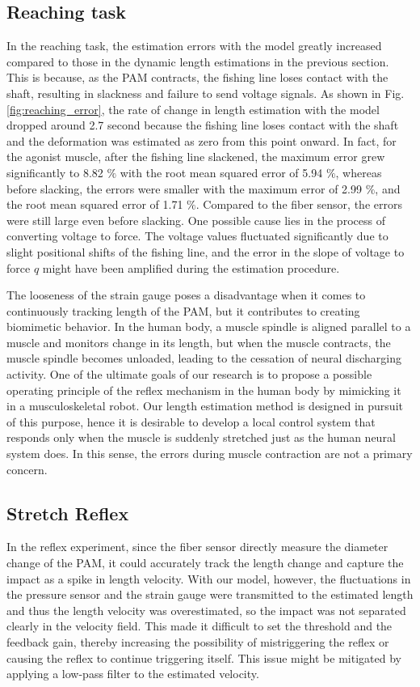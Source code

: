 \subsection{Reaching task}
In the reaching task, the estimation errors with the model greatly increased compared to those in the dynamic length estimations in the previous section. This is because, as the PAM contracts, the fishing line loses contact with the shaft, resulting in slackness and failure to send voltage signals. As shown in Fig.\ref{fig:reaching_error}, the rate of change in length estimation with the model dropped around 2.7 second because the fishing line loses contact with the shaft and the deformation was estimated as zero from this point onward. In fact, for the agonist muscle, after the fishing line slackened, the maximum error grew significantly to 8.82 $\%$ with the root mean squared error of 5.94 $\%$, whereas before slacking, the errors were smaller with the maximum error of 2.99 $\%$, and the root mean squared error of 1.71 $\%$. Compared to the fiber sensor, the errors were still large even before slacking. One possible cause lies in the process of converting voltage to force. The voltage values fluctuated significantly due to slight positional shifts of the fishing line, and the error in the slope of voltage to force $q$ might have been amplified during the estimation procedure.

The looseness of the strain gauge poses a disadvantage when it comes to continuously tracking length of the PAM, but it contributes to creating biomimetic behavior. In the human body, a muscle spindle is aligned parallel to a muscle and monitors change in its length, but when the muscle contracts, the muscle spindle becomes unloaded, leading to the cessation of neural discharging activity\cite{spindle}. One of the ultimate goals of our research is to propose a possible operating principle of the reflex mechanism in the human body by mimicking it in a musculoskeletal robot. Our length estimation method is designed in pursuit of this purpose, hence it is desirable to develop a local control system that responds only when the muscle is suddenly stretched just as the human neural system does. In this sense, the errors during muscle contraction are not a primary concern.

\subsection{Stretch Reflex}
In the reflex experiment, since the fiber sensor directly measure the diameter change of the PAM, it could accurately track the length change and capture the impact as a spike in length velocity. With our model, however, the fluctuations in the pressure sensor and the strain gauge were transmitted to the estimated length and thus the length velocity was overestimated, so the impact was not separated clearly in the velocity field. This made it difficult to set the threshold and the feedback gain, thereby increasing the possibility of mistriggering the reflex or causing the reflex to continue triggering itself. This issue might be mitigated by applying a low-pass filter to the estimated velocity.

